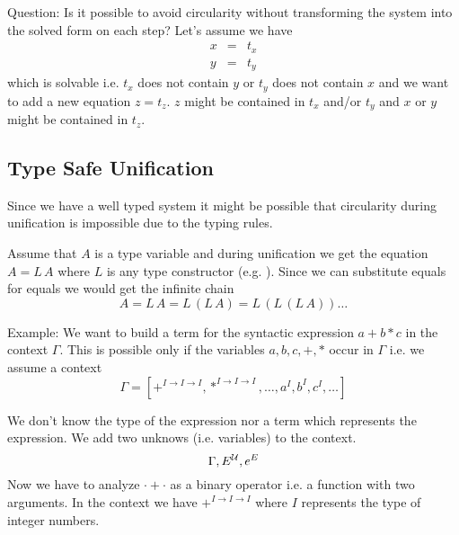 Question: Is it possible to avoid circularity without transforming the system
into the solved form on each step? Let's assume we have
$$
%
\begin{array}{lll}
  x &=& t_x
  \\
  y &=& t_y
\end{array}
$$
%
which is solvable i.e. $t_x$ does not contain $y$ or $t_y$ does not contain
$x$ and we want to add a new equation $z = t_z$. $z$ might be contained in
$t_x$ and/or $t_y$ and $x$ or $y$ might be contained in $t_z$.




\subsection{Type Safe Unification}

Since we have a well typed system it might be possible that circularity during
unification is impossible due to the typing rules.

Assume that $A$ is a type variable and during unification we get the equation
$A = L\, A$ where $L$ is any type constructor (e.g. ). Since we can
substitute equals for equals we would get the infinite chain
$$
  A = L\, A = L\, (L\, A) = L\, (L\, (L\, A)) \ldots
$$



Example: We want to build a term for the syntactic expression $a + b * c$ in
the context $\Gamma$. This is possible only if the variables $a, b, c, +, *$
occur in $\Gamma$ i.e. we assume a context
$$
\Gamma = [+^{I\to I\to I}, *^{I\to I\to I}, \ldots, a^I, b^I, c^I, \ldots]
$$


We don't know the type of the expression nor a term which
represents the expression. We add two unknows (i.e. variables) to the context.
%
$$
\Gamma, E^{\cal{U}}, e^E
$$
%
Now we have to analyze $\cdot + \cdot$ as a binary operator i.e. a function
with two arguments. In the context we have $+^{I \to I \to I}$ where $I$
represents the type of integer numbers.

